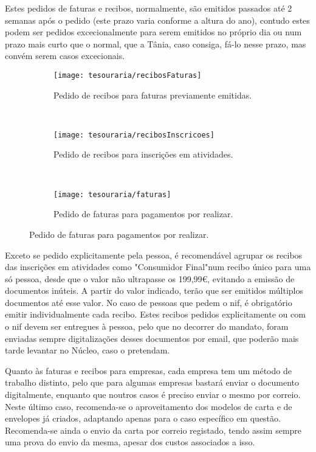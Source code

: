 Estes pedidos de faturas e recibos, normalmente, são emitidos passados até 2 semanas após o pedido (este prazo varia conforme a altura do ano), contudo estes podem ser pedidos excecionalmente para serem emitidos no próprio dia ou num prazo mais curto que o normal, que a Tânia, caso consiga, fá-lo nesse prazo, mas convém serem casos excecionais.

\begin{figure}[ht]
    \centering
    \begin{subfigure}[t]{0.3\textwidth}
        \texttt{[image: tesouraria/recibosFaturas]}
        \caption{Pedido de recibos para faturas previamente emitidas.}
        \label{fig:Tesouraria-recibosFaturas}
    \end{subfigure}
    ~
    \begin{subfigure}[t]{0.3\textwidth}
        \texttt{[image: tesouraria/recibosInscricoes]}
        \caption{Pedido de recibos para inscrições em atividades.}
        \label{fig:Tesouraria-recibosInscricoes}
    \end{subfigure}
    ~
    \begin{subfigure}[t]{0.3\textwidth}
        \texttt{[image: tesouraria/faturas]}
        \caption{Pedido de faturas para pagamentos por realizar.}
        \label{fig:Tesouraria-faturas}
    \end{subfigure}
\end{figure}

{ %
Exceto se pedido explicitamente pela pessoa, é recomendável agrupar os recibos das inscrições em atividades como "Consumidor Final"\space num recibo único para uma só pessoa, desde que o valor não ultrapasse os 199,99€, evitando a emissão de documentos inúteis. A partir do valor indicado, terão que ser emitidos múltiplos documentos até esse valor. No caso de pessoas que pedem o \acrshort{nif}, é obrigatório emitir individualmente cada recibo. Estes recibos pedidos explicitamente ou com o \acrshort{nif} devem ser entregues à pessoa, pelo que no decorrer do mandato, foram enviadas sempre digitalizações desses documentos por email, que poderão mais tarde levantar no Núcleo, caso o pretendam.
}
{ %
}

Quanto às faturas e recibos para empresas, cada empresa tem um método de trabalho distinto, pelo que para algumas empresas bastará enviar o documento digitalmente, enquanto que noutros casos é preciso enviar o mesmo por correio. Neste último caso, recomenda-se o aproveitamento dos modelos de carta e de envelopes já criados, adaptando apenas para o caso específico em questão. Recomenda-se ainda o envio da carta por correio registado, tendo assim sempre uma prova do envio da mesma, apesar dos custos associados a isso.

